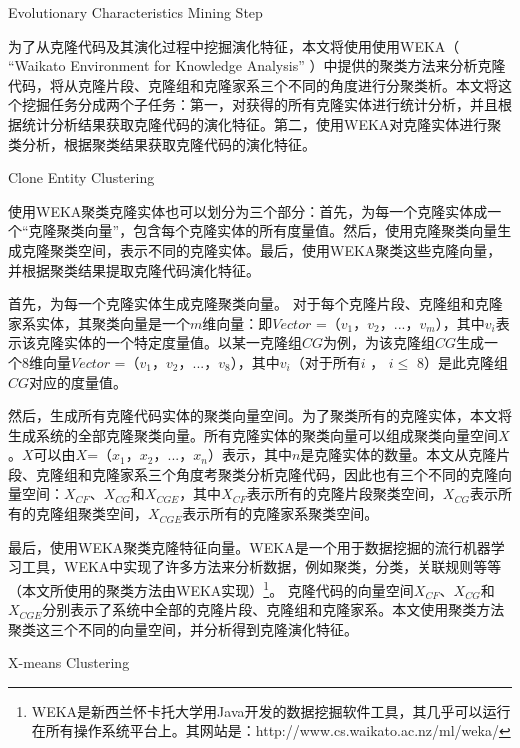 {Evolutionary Characteristics Mining Step}

为了从克隆代码及其演化过程中挖掘演化特征，本文将使用使用WEKA（ “Waikato Environment for Knowledge Analysis” \cite{hall2009weka}）中提供的聚类方法来分析克隆代码，将从克隆片段、克隆组和克隆家系三个不同的角度进行分聚类析。本文将这个挖掘任务分成两个子任务：第一，对获得的所有克隆实体进行统计分析，并且根据统计分析结果获取克隆代码的演化特征。第二，使用WEKA对克隆实体进行聚类分析，根据聚类结果获取克隆代码的演化特征。%


{Clone Entity Clustering}

使用WEKA聚类克隆实体也可以划分为三个部分：首先，为每一个克隆实体成一个“克隆聚类向量”，包含每个克隆实体的所有度量值。然后，使用克隆聚类向量生成克隆聚类空间，表示不同的克隆实体。最后，使用WEKA聚类这些克隆向量，并根据聚类结果提取克隆代码演化特征。

 首先，为每一个克隆实体生成克隆聚类向量。 对于每个克隆片段、克隆组和克隆家系实体，其聚类向量是一个$m$维向量：即{$Vector$ ={（$v_1$，$v_2$，$...$，$v_m$）}}，其中$v_i$表示该克隆实体的一个特定度量值。以某一克隆组{$CG$}为例，为该克隆组{$CG$}生成一个8维向量{$Vector$ =（$v_1$，$v_2$，$...$，$v_8$）}，其中$v_i$（对于所有$i$ ， $i \leq $ 8）是此克隆组{$CG$}对应的度量值。
 
然后，生成所有克隆代码实体的聚类向量空间。为了聚类所有的克隆实体，本文将生成系统的全部克隆聚类向量。所有克隆实体的聚类向量可以组成聚类向量空间$X$。$X$可以由{$X$={（$x_1$，$x_2$，$...$，$x_n$）}}表示，其中$n$是克隆实体的数量。本文从克隆片段、克隆组和克隆家系三个角度考聚类分析克隆代码，因此也有三个不同的克隆向量空间：$X_{CF}$、$X_{CG}$和$X_{CGE}$，其中$X_{CF}$表示所有的克隆片段聚类空间，$X_{CG}$表示所有的克隆组聚类空间，$X_{CGE}$表示所有的克隆家系聚类空间。
  
最后，使用WEKA聚类克隆特征向量。WEKA是一个用于数据挖掘的流行机器学习工具，WEKA中实现了许多方法来分析数据，例如聚类，分类，关联规则等等（本文所使用的聚类方法由WEKA实现）\footnote{WEKA是新西兰怀卡托大学用Java开发的数据挖掘软件工具，其几乎可以运行在所有操作系统平台上。其网站是：http://www.cs.waikato.ac.nz/ml/weka/}。 克隆代码的向量空间$X_{CF}$、$X_{CG}$和$X_{CGE}$分别表示了系统中全部的克隆片段、克隆组和克隆家系。本文使用聚类方法聚类这三个不同的向量空间，并分析得到克隆演化特征。

{X-means Clustering}

